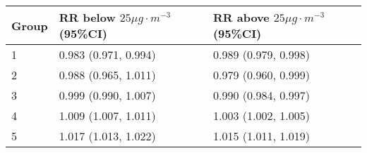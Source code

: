 \begin{tabular}{lll}
  \hline
Group & RR below $25 \mu g \cdot m^{-3}$ (95\%CI) & RR above $25 \mu g \cdot m^{-3}$ (95\%CI) \\ 
  \hline
   1 & 0.983 (0.971, 0.994) & 0.989 (0.979, 0.998) \\ 
     2 & 0.988 (0.965, 1.011) & 0.979 (0.960, 0.999) \\ 
     3 & 0.999 (0.990, 1.007) & 0.990 (0.984, 0.997) \\ 
     4 & 1.009 (1.007, 1.011) & 1.003 (1.002, 1.005) \\ 
     5 & 1.017 (1.013, 1.022) & 1.015 (1.011, 1.019) \\ 
   \hline
\end{tabular}

